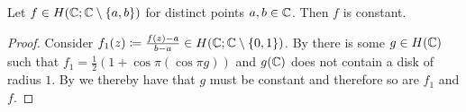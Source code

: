 \begin{theorem} \label{thm:picard-little}
    Let $f \in H(\mathbb{C}; \mathbb{C} \setminus \{ a, b \})$ for distinct points $a, b \in \mathbb{C}$. Then $f$ is constant.
\end{theorem}

\begin{proof}
    Consider $f_1(z) \coloneqq \frac{f(z) - a}{b - a} \in H(\mathbb{C}; \mathbb{C} \setminus \{ 0, 1 \})$. By  there is some $g \in H(\mathbb{C})$ such that $f_1 = \frac{1}{2}(1 + \cos \pi (\cos \pi g))$ and $g(\mathbb{C})$ does not contain a disk of radius $1$. By  we thereby have that $g$ must be constant and therefore so are $f_1$ and $f$.
\end{proof}